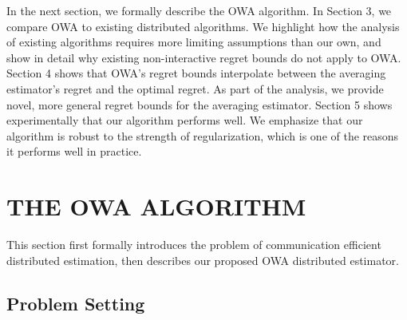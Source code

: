 \documentclass[twoside]{article}
\DeclareMathOperator*{\argmax}{arg\,max}
\newcommand{\Y}{\mathcal{Y}}
\newcommand{\X}{\mathcal{X}}
\newcommand{\x}{\mathbf{x}}
\newcommand{\w}{\theta}
\newcommand{\wmle}{\hat\w^{erm}}
\newcommand{\loss}{\ell}
\newcommand{\trans}[1]{\ensuremath{{#1}^{\mathsf{T}}}}
\begin{document}

In the next section, we formally describe the OWA algorithm.
In Section 3, we compare OWA to existing distributed algorithms.
We highlight how the analysis of existing algorithms requires more limiting assumptions than our own,
and show in detail why existing non-interactive regret bounds do not apply to OWA.
Section 4 shows that OWA's regret bounds interpolate between the averaging estimator's regret and the optimal regret.
As part of the analysis, we provide novel, more general regret bounds for the averaging estimator.
Section 5 shows experimentally that our algorithm performs well.
We emphasize that our algorithm is robust to the strength of regularization,
which is one of the reasons it performs well in practice.

\section{THE OWA ALGORITHM}


This section first formally introduces the problem of communication efficient distributed estimation,
then describes our proposed OWA distributed estimator.

\subsection{Problem Setting}
\end{document}
